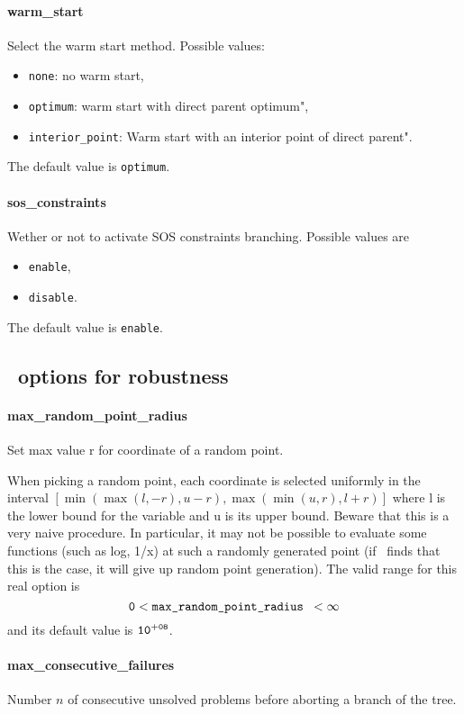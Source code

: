 \paragraph{warm\_start}
\label{warm_start}
Select the warm start method. Possible values:
\begin{itemize}
 \item {\tt none}: no warm start,
\item {\tt optimum}: warm start with direct parent optimum",
\item {\tt interior\_point}: Warm start with an interior point of direct parent".
\end{itemize}
The default value is {\tt optimum}.

\paragraph{sos\_constraints}
\label{sos_constraint}
Wether or not to activate SOS constraints branching. Possible values are
\begin{itemize}
 \item {\tt enable},
\item {\tt disable}.
\end{itemize}
The default value is {\tt enable}.

\subsection{\Bonmin\ options for robustness}

\paragraph{max\_random\_point\_radius}
\label{max_random_point_radius}
Set max value r for coordinate of a random point.

 When picking a random point, each coordinate is selected uniformly
in the interval $[\min(\max(l,-r),u-r),
\max(\min(u,r),l+r)]$ where l is the lower bound
for the variable and u is its upper bound.
Beware that this is a very naive procedure. In particular,
it may not be possible to evaluate some functions (such as log, 1/x)
at such a randomly generated point (if \Bonmin\  finds that this is the case,
it will give up random point generation).
The valid range for this real option is
$${\tt 0} <  \hbox{\tt max\_random\_point\_radius } <  \infty$$
and its default value is ${\tt 10^{+08}}$.


\paragraph{max\_consecutive\_failures}
\label{max_consecutive_failures}
Number $n$ of consecutive unsolved problems before aborting
a branch of the tree.

